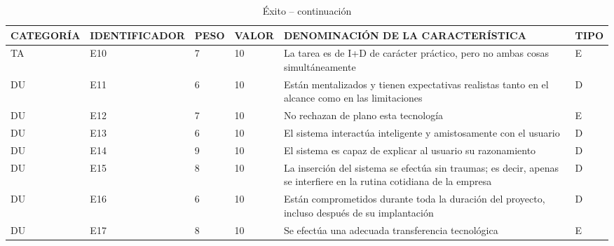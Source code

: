 \documentclass[a4paper,12pt]{article}
\begin{document}
\begin{table}[h]
	\centering
	\begin{tabular}{|l|l|l|l|p{4cm}|l|}
		\hline
		\scriptsize CATEGORÍA & \scriptsize IDENTIFICADOR & \scriptsize PESO & \scriptsize VALOR & \scriptsize DENOMINACIÓN DE LA CARACTERÍSTICA                                                                        & \scriptsize TIPO \\ \hline
		TA                    & E10                       & 7                & 10                & La tarea es de I+D de carácter práctico, pero no ambas cosas simultáneamente                                         & E                \\ \hline
		DU                    & E11                       & 6                & 10                & Están mentalizados y tienen expectativas realistas tanto en el alcance como en las limitaciones                      & D                \\ \hline
		DU                    & E12                       & 7                & 10                & No rechazan de plano esta tecnología                                                                                 & E                \\ \hline
		DU                    & E13                       & 6                & 10                & El sistema interactúa inteligente y amistosamente con el usuario                                                     & D                \\ \hline
		DU                    & E14                       & 9                & 10                & El sistema es capaz de explicar al usuario su razonamiento                                                           & D                \\ \hline
		DU                    & E15                       & 8                & 10                & La inserción del sistema se efectúa sin traumas; es decir, apenas se interfiere en la rutina cotidiana de la empresa & D                \\ \hline
		DU                    & E16                       & 6                & 10                & Están comprometidos durante toda la duración del proyecto, incluso después de su implantación                        & D                \\ \hline
		DU                    & E17                       & 8                & 10                & Se efectúa una adecuada transferencia tecnológica                                                                    & E                \\ \hline
	\end{tabular}
\caption{Éxito -- continuación}
\label{tab:exito2}
\end{table}

\end{document}
